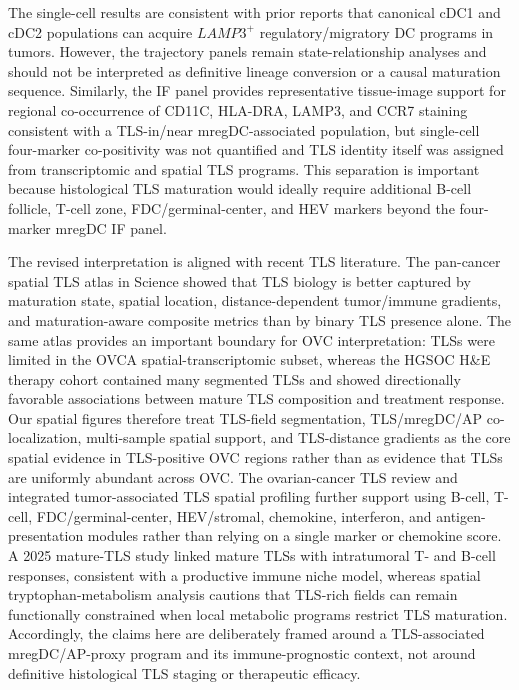\documentclass[pdflatex,sn-vancouver-num]{sn-jnl}
\begin{document}
The single-cell results are consistent with prior reports that canonical cDC1 and cDC2 populations can acquire $LAMP3^{+}$ regulatory/migratory DC programs in tumors\cite{bib17,bib18,bib20,bib21}. However, the trajectory panels remain state-relationship analyses and should not be interpreted as definitive lineage conversion or a causal maturation sequence. Similarly, the IF panel provides representative tissue-image support for regional co-occurrence of CD11C, HLA-DRA, LAMP3, and CCR7 staining consistent with a TLS-in/near mregDC-associated population, but single-cell four-marker co-positivity was not quantified and TLS identity itself was assigned from transcriptomic and spatial TLS programs. This separation is important because histological TLS maturation would ideally require additional B-cell follicle, T-cell zone, FDC/germinal-center, and HEV markers beyond the four-marker mregDC IF panel.

The revised interpretation is aligned with recent TLS literature. The pan-cancer spatial TLS atlas in Science showed that TLS biology is better captured by maturation state, spatial location, distance-dependent tumor/immune gradients, and maturation-aware composite metrics than by binary TLS presence alone\cite{bib118}. The same atlas provides an important boundary for OVC interpretation: TLSs were limited in the OVCA spatial-transcriptomic subset, whereas the HGSOC H\&E therapy cohort contained many segmented TLSs and showed directionally favorable associations between mature TLS composition and treatment response\cite{bib118}. Our spatial figures therefore treat TLS-field segmentation, TLS/mregDC/AP co-localization, multi-sample spatial support, and TLS-distance gradients as the core spatial evidence in TLS-positive OVC regions rather than as evidence that TLSs are uniformly abundant across OVC. The ovarian-cancer TLS review and integrated tumor-associated TLS spatial profiling further support using B-cell, T-cell, FDC/germinal-center, HEV/stromal, chemokine, interferon, and antigen-presentation modules rather than relying on a single marker or chemokine score\cite{bib119,bib122}. A 2025 mature-TLS study linked mature TLSs with intratumoral T- and B-cell responses, consistent with a productive immune niche model, whereas spatial tryptophan-metabolism analysis cautions that TLS-rich fields can remain functionally constrained when local metabolic programs restrict TLS maturation\cite{bib120,bib121}. Accordingly, the claims here are deliberately framed around a TLS-associated mregDC/AP-proxy program and its immune-prognostic context, not around definitive histological TLS staging or therapeutic efficacy.
\end{document}
